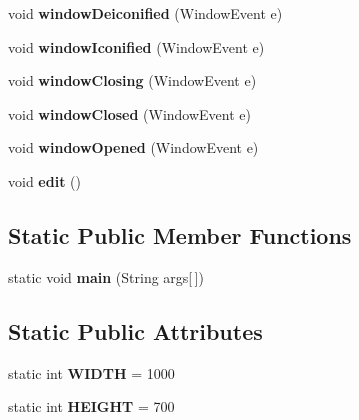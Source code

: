 \begin{DoxyCompactItemize}
\item 
\hypertarget{classbrick_breaker_1_1_start_a7a77b64bcea5b507ae49463baa3f0282}{
void {\bfseries windowDeiconified} (WindowEvent e)}
\label{classbrick_breaker_1_1_start_a7a77b64bcea5b507ae49463baa3f0282}

\item 
\hypertarget{classbrick_breaker_1_1_start_aaadc30e22fd645a756381bedd0c35c9e}{
void {\bfseries windowIconified} (WindowEvent e)}
\label{classbrick_breaker_1_1_start_aaadc30e22fd645a756381bedd0c35c9e}

\item 
\hypertarget{classbrick_breaker_1_1_start_a11168f9afbcfc8cac2b7570a3a0dfa09}{
void {\bfseries windowClosing} (WindowEvent e)}
\label{classbrick_breaker_1_1_start_a11168f9afbcfc8cac2b7570a3a0dfa09}

\item 
\hypertarget{classbrick_breaker_1_1_start_a00d57f66b787a7eea85773c2f5c9fd62}{
void {\bfseries windowClosed} (WindowEvent e)}
\label{classbrick_breaker_1_1_start_a00d57f66b787a7eea85773c2f5c9fd62}

\item 
\hypertarget{classbrick_breaker_1_1_start_a0c42ef06bf5158b92edc91d34ee5c038}{
void {\bfseries windowOpened} (WindowEvent e)}
\label{classbrick_breaker_1_1_start_a0c42ef06bf5158b92edc91d34ee5c038}

\item 
\hypertarget{classbrick_breaker_1_1_start_a988d6bb03340ad92e27da5a3b6bef95d}{
void {\bfseries edit} ()}
\label{classbrick_breaker_1_1_start_a988d6bb03340ad92e27da5a3b6bef95d}

\end{DoxyCompactItemize}
\subsection*{Static Public Member Functions}
\begin{DoxyCompactItemize}
\item 
\hypertarget{classbrick_breaker_1_1_start_a1c5523121a86c315e8487d3dc826500c}{
static void {\bfseries main} (String args\mbox{[}$\,$\mbox{]})}
\label{classbrick_breaker_1_1_start_a1c5523121a86c315e8487d3dc826500c}

\end{DoxyCompactItemize}
\subsection*{Static Public Attributes}
\begin{DoxyCompactItemize}
\item 
\hypertarget{classbrick_breaker_1_1_start_a0cb22b25bc82b86148838e67d553453a}{
static int {\bfseries WIDTH} = 1000}
\label{classbrick_breaker_1_1_start_a0cb22b25bc82b86148838e67d553453a}

\item 
\hypertarget{classbrick_breaker_1_1_start_a06e396be377a68ab41caabfe45ba0951}{
static int {\bfseries HEIGHT} = 700}
\label{classbrick_breaker_1_1_start_a06e396be377a68ab41caabfe45ba0951}

\end{DoxyCompactItemize}
